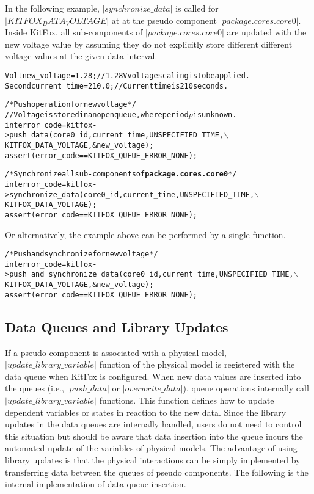 \noindent
In the following example, $|synchronize\_data|$ is called for $|KITFOX_DATA_VOLTAGE|$ at at the pseudo component $|package.cores.core0|$. Inside KitFox, all sub-components of $|package.cores.core0|$ are updated with the new voltage value by assuming they do not explicitly store different different voltage values at the given data interval.
{
\fontsize{10pt}{11pt}\selectfont
\begin{alltt}
Volt new_voltage = 1.28; // 1.28V voltage scaling is to be applied.
Second current_time = 210.0; // Current time is 210 seconds.

/* Push operation for new voltage */
// Voltage is stored in an open queue, where period \(p\) is unknown.
int error_code = kitfox->push_data(core0_id, current_time, UNSPECIFIED_TIME,\(\backslash\)
                                   KITFOX_DATA_VOLTAGE, &new_voltage);
assert(error_code == KITFOX_QUEUE_ERROR_NONE);

/* Synchronize all sub-components of{\bf package.cores.core0}  */
int error_code = kitfox->synchronize_data(core0_id, current_time, UNSPECIFIED_TIME,\(\backslash\)
                                          KITFOX_DATA_VOLTAGE);
assert(error_code == KITFOX_QUEUE_ERROR_NONE);
\end{alltt}}

\noindent
Or alternatively, the example above can be performed by a single function.

{
\fontsize{10pt}{11pt}\selectfont
\begin{alltt}
/* Push and synchronize for new voltage */
int error_code = kitfox->push_and_synchronize_data(core0_id, current_time, UNSPECIFIED_TIME,\(\backslash\)
                                                   KITFOX_DATA_VOLTAGE, &new_voltage);
assert(error_code == KITFOX_QUEUE_ERROR_NONE);
\end{alltt}
}

\subsection{Data Queues and Library Updates} \label{subsec:library_updates}
\noindent
If a pseudo component is associated with a physical model, $|update\_library\_variable|$ function of the physical model is registered with the data queue when KitFox is configured. 
When new data values are inserted into the queues (i.e., $|push\_data|$ or $|overwrite\_data|$), queue operations internally call $|update\_library\_variable|$ functions. 
This function defines how to update dependent variables or states in reaction to the new data. 
Since the library updates in the data queues are internally handled, users do not need to control this situation but should be aware that data insertion into the queue incurs the automated update of the variables of physical models. 
The advantage of using library updates is that the physical interactions can be simply implemented by transferring data between the queues of pseudo components. 
The following is the internal implementation of data queue insertion.

